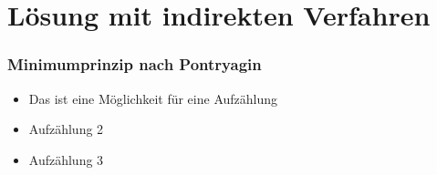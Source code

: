 \documentclass[aspectratio=169]{beamer}
\begin{document}
\section{Lösung mit indirekten Verfahren}
\begin{frame}
  \frametitle{Minimumprinzip nach Pontryagin}
\vspace{-2.6cm}
  \begin{itemize}
    \item Das ist eine M\"{o}glichkeit f\"{u}r eine Aufz\"{a}hlung
    \item Aufz\"{a}hlung 2
    \item Aufz\"{a}hlung 3
  \end{itemize}
\end{frame}
\end{document}
